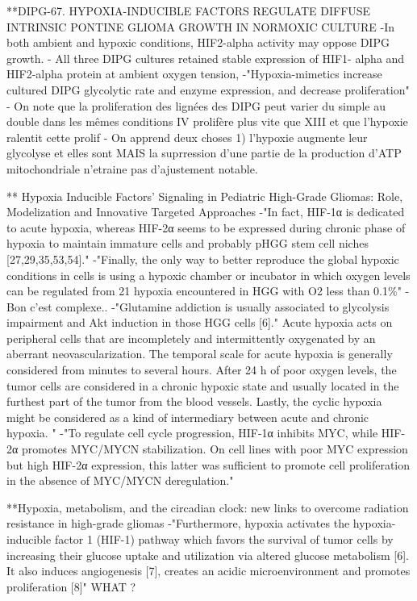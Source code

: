 \documentclass[11pt,a4paper]{article}
\begin{document}
**DIPG-67. HYPOXIA-INDUCIBLE FACTORS REGULATE DIFFUSE INTRINSIC PONTINE GLIOMA GROWTH IN NORMOXIC CULTURE
-In both ambient and hypoxic conditions, HIF2-alpha activity may oppose DIPG growth.
- All three DIPG cultures retained stable expression of HIF1-
alpha and HIF2-alpha protein at ambient oxygen tension, 
-"Hypoxia-mimetics increase cultured DIPG glycolytic rate and enzyme expression, and decrease
proliferation"
- On note que la proliferation des lignées des DIPG peut varier du simple au double dans les mêmes conditions IV prolifère plus vite que XIII et que l'hypoxie ralentit cette prolif
- On apprend deux choses 1) l'hypoxie augmente leur glycolyse et elles sont MAIS la suprression d'une partie de la production d'ATP mitochondriale n'etraine pas d'ajustement notable.

** Hypoxia Inducible Factors’ Signaling in Pediatric High-Grade Gliomas: Role, Modelization and Innovative Targeted Approaches
-"In fact, HIF-1α is dedicated to acute hypoxia, whereas HIF-2α seems to be expressed during chronic phase of hypoxia to maintain immature cells and probably pHGG stem cell niches [27,29,35,53,54]."
-"Finally, the only way to better reproduce the global hypoxic conditions in cells is using a hypoxic
chamber or incubator in which oxygen levels can be regulated from 21%
hypoxia encountered in HGG with O2 less than 0.1\%"
- Bon c'est complexe..
-"Glutamine addiction is usually associated to glycolysis impairment and Akt induction in those HGG cells [6]."
Acute hypoxia acts on peripheral cells that are incompletely and intermittently oxygenated by an aberrant neovascularization. The temporal scale for acute hypoxia is generally considered from minutes to several hours. After 24 h of poor oxygen levels, the tumor cells are considered in a chronic hypoxic state and usually located in the furthest part of the tumor from the blood vessels. Lastly, the cyclic hypoxia might be considered as a kind of intermediary between acute and chronic hypoxia. "
-"To regulate cell cycle progression, HIF-1α inhibits MYC, while HIF-2α promotes MYC/MYCN stabilization. On cell lines with poor MYC expression but high HIF-2α expression, this latter was sufficient to promote cell proliferation in the absence of MYC/MYCN deregulation."

**Hypoxia, metabolism, and the circadian clock: new links to overcome radiation resistance in high-grade gliomas
-"Furthermore, hypoxia activates the hypoxia-inducible factor 1 (HIF-1) pathway which favors the survival of tumor cells by increasing their glucose uptake and utilization via altered glucose metabolism [6]. It also induces angiogenesis [7], creates an acidic microenvironment and promotes proliferation [8]" WHAT ?
\end{document}
